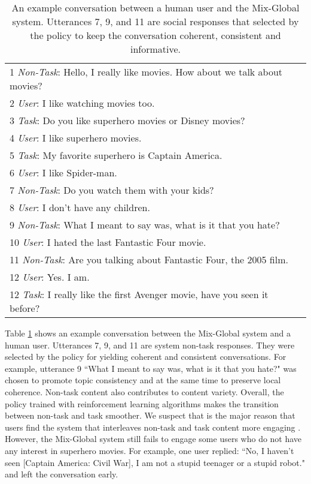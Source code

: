 \documentclass[11pt]{article}
\newcommand{\dk}[1]{{\color{red} #1}}
\begin{document}
\begin{table}
\begin{tabular}{p{8.5cm}}
\hline
1 \textit{Non-Task}: Hello, I really like movies. How about we talk about movies? \\
2 \textit{User}: I like watching movies too. \\
3 \textit{Task}: Do you like superhero  movies or Disney movies?\\
4 \textit{User}: I like superhero movies. \\
5 \textit{Task}: My favorite superhero is Captain America.\\ 
6 \textit{User}: I like Spider-man.\\
7 \textit{Non-Task}: Do you watch them with your kids?\\ 
8 \textit{User}: I don't have any children. \\
9 \textit{Non-Task}: What I meant to say was, what is it that you hate?\\
10 \textit{User}: I hated the last Fantastic Four movie.\\
11 \textit{Non-Task}: Are you talking about Fantastic Four, the 2005 film.\\
12 \textit{User}: Yes. I am.\\
12 \textit{Task}: I really like the first Avenger movie, have you seen it before?\\
\hline
\end{tabular}
\caption{An example conversation between a human user and the Mix-Global system. Utterances 7, 9, and 11 are social responses that selected by the policy to keep the conversation coherent, consistent and informative. }
\label{table:example}
\end{table}
Table \ref{table:example} shows an example conversation between the Mix-Global system and a human user. Utterances 7, 9, and 11 are system non-task responses. They were selected by the policy for yielding coherent and consistent conversations. For example, utterance 9 ``What I meant to say was, what is it that you hate?" was chosen to promote topic consistency and at the same time to preserve local coherence. Non-task content also contributes to content variety. Overall, the policy trained with reinforcement learning algorithms makes the transition between non-task and task smoother. We suspect that is the major reason that users find the system that interleaves non-task and task content more engaging %
. However, the Mix-Global system still fails to engage some users who do not have any interest in superhero movies. For example, one user replied: ``No, I haven't seen [Captain America: Civil War], I am not a stupid teenager or a stupid robot." and left the conversation early. \\
\end{document}

